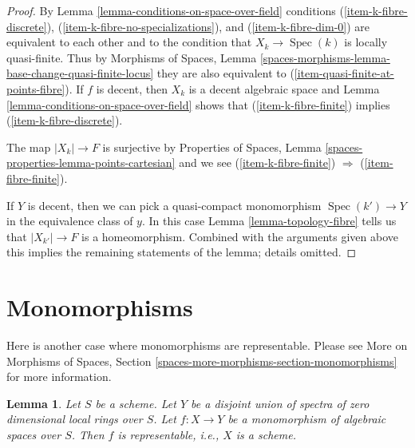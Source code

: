 \documentclass{stacks-project}
\theoremstyle{plain}
\newtheorem{lemma}[subsection]{Lemma}
\theoremstyle{definition}
\theoremstyle{remark}
\numberwithin{equation}{subsection}
\def\Spec{\mathop{\mathrm{Spec}}}
\begin{document}
\begin{proof}
By Lemma \ref{lemma-conditions-on-space-over-field}
conditions  (\ref{item-k-fibre-discrete}),
(\ref{item-k-fibre-no-specializations}), and (\ref{item-k-fibre-dim-0})
are equivalent to each other and to the condition that
$X_k \to \Spec(k)$ is locally quasi-finite.
Thus by Morphisms of Spaces, Lemma
\ref{spaces-morphisms-lemma-base-change-quasi-finite-locus}
they are also equivalent to (\ref{item-quasi-finite-at-points-fibre}).
If $f$ is decent, then $X_k$ is a decent algebraic space and
Lemma \ref{lemma-conditions-on-space-over-field}
shows that (\ref{item-k-fibre-finite}) implies (\ref{item-k-fibre-discrete}).

\medskip\noindent
The map $|X_k| \to F$ is surjective by
Properties of Spaces, Lemma \ref{spaces-properties-lemma-points-cartesian}
and we see
(\ref{item-k-fibre-finite}) $\Rightarrow$ (\ref{item-fibre-finite}).

\medskip\noindent
If $Y$ is decent, then we can pick a quasi-compact monomorphism
$\Spec(k') \to Y$ in the equivalence class of $y$. In this case
Lemma \ref{lemma-topology-fibre}
tells us that $|X_{k'}| \to F$ is a homeomorphism.
Combined with the arguments given above this implies
the remaining statements of the lemma; details omitted.
\end{proof}







\section{Monomorphisms}
\label{section-monomorphisms}

\noindent
Here is another case where monomorphisms are representable.
Please see More on Morphisms of Spaces, Section
\ref{spaces-more-morphisms-section-monomorphisms}
for more information.

\begin{lemma}
\label{lemma-monomorphism-toward-disjoint-union-dim-0-rings}
Let $S$ be a scheme. Let $Y$ be a disjoint union of spectra of
zero dimensional local rings over $S$.
Let $f : X \to Y$ be a monomorphism of algebraic spaces over $S$.
Then $f$ is representable, i.e., $X$ is a scheme.
\end{lemma}
\end{document}

